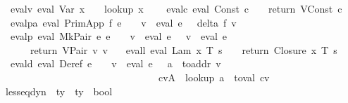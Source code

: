\begin{isabellebody}
\ \ evalv{\isacharcolon}\ {\isachardoublequoteopen}eval\ {\isacharparenleft}Var\ x{\isacharparenright}\ {\isasymrho}\ {\isasymmu}\ {\isacharequal}\ lookup\ x\ {\isasymrho}{\isachardoublequoteclose}\ {\isacharbar}\isanewline
\ \ evalc{\isacharcolon}\ {\isachardoublequoteopen}eval\ {\isacharparenleft}Const\ c{\isacharparenright}\ {\isasymrho}\ {\isasymmu}\ {\isacharequal}\ return\ {\isacharparenleft}VConst\ c{\isacharparenright}{\isachardoublequoteclose}\ {\isacharbar}\isanewline
\ \ evalpa{\isacharcolon}\ {\isachardoublequoteopen}eval\ {\isacharparenleft}PrimApp\ f\ e{\isacharparenright}\ {\isasymrho}\ {\isasymmu}\ {\isacharequal}\ {\isacharparenleft}v\ {\isacharcolon}{\isacharequal}\ eval\ e\ {\isasymrho}\ {\isasymmu}{\isacharsemicolon}\ delta\ f\ v{\isacharparenright}{\isachardoublequoteclose}\ {\isacharbar}\isanewline
\ \ evalp{\isacharcolon}\ {\isachardoublequoteopen}eval\ {\isacharparenleft}MkPair\ e{}\ e{}{\isacharparenright}\ {\isasymrho}\ {\isasymmu}\ {\isacharequal}\ {\isacharparenleft}v{}\ {\isacharcolon}{\isacharequal}\ eval\ e{}\ {\isasymrho}\ {\isasymmu}{\isacharsemicolon}\ v{}\ {\isacharcolon}{\isacharequal}\ eval\ e{}\ {\isasymrho}\ {\isasymmu}{\isacharsemicolon}\ \isanewline
\ \ \ \ \ \ return\ {\isacharparenleft}VPair\ v{}\ v{}{\isacharparenright}{\isacharparenright}{\isachardoublequoteclose}\ {\isacharbar}\isanewline
\ \ evall{\isacharcolon}\ {\isachardoublequoteopen}eval\ {\isacharparenleft}Lam\ x\ T\ s{\isacharparenright}\ {\isasymrho}\ {\isasymmu}\ {\isacharequal}\ return\ {\isacharparenleft}Closure\ x\ T\ s\ {\isasymrho}{\isacharparenright}{\isachardoublequoteclose}\ {\isacharbar}\isanewline
\ \ evald{\isacharcolon}\ {\isachardoublequoteopen}eval\ {\isacharparenleft}Deref\ e{\isacharparenright}\ {\isasymrho}\ {\isasymmu}\ {\isacharequal}\ {\isacharparenleft}v\ {\isacharcolon}{\isacharequal}\ eval\ e\ {\isasymrho}\ {\isasymmu}{\isacharsemicolon}\ a\ {\isacharcolon}{\isacharequal}\ to{\isacharunderscore}addr\ v{\isacharsemicolon}\isanewline
\ \ \ \ \ \ \ \ \ \ \ \ \ \ \ \ \ \ \ \ \ \ \ \ \ \ \ \ \ \ \ \ {\isacharparenleft}cv{\isacharcomma}A{\isacharparenright}\ {\isacharcolon}{\isacharequal}\ lookup\ a\ {\isasymmu}{\isacharsemicolon}\ to{\isacharunderscore}val\ cv{\isacharparenright}{\isachardoublequoteclose}\isanewline
\isanewline
{}\isamarkupfalse \ lesseq{\isacharunderscore}dyn\ {\isacharcolon}{\isacharcolon}\ {\isachardoublequoteopen}ty\ {\isasymRightarrow}\ ty\ {\isasymRightarrow}\ bool{\isachardoublequoteclose}\ {\isacharparenleft}\ {\isachardoublequoteopen}{\isasymsqsubseteq}{\isachardoublequoteclose}\ {}{}{\isacharparenright}\ \isanewline

\end{isabellebody}
